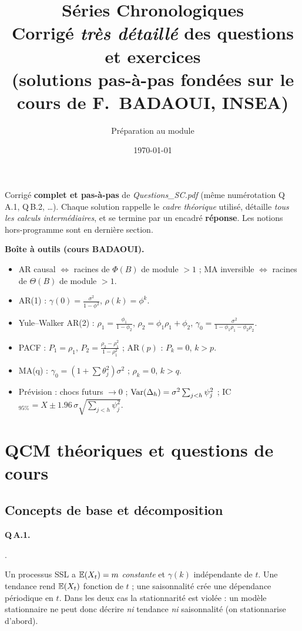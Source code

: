 \documentclass[11pt]{article}
\title{\vspace{-1cm}\textbf{\color{insea}Séries Chronologiques}\\[2mm]
\large Corrigé \emph{très détaillé} des questions et exercices\\[1mm]
\normalsize (solutions pas-à-pas fondées sur le cours de F.~BADAOUI, INSEA)}
\author{Préparation au module}
\date{\today}
\begin{document}
\maketitle
\thispagestyle{empty}

\begin{tcolorbox}[colback=insealight,colframe=insea,title={Mode d'emploi}]
Corrigé \textbf{complet et pas-à-pas} de \emph{Questions\_SC.pdf} (même numérotation
Q\,A.1, Q\,B.2, \dots). Chaque solution rappelle le \emph{cadre théorique} utilisé, détaille
\emph{tous les calculs intermédiaires}, et se termine par un encadré \textbf{\color{vert}réponse}.
Les notions hors-programme \horsprog{} sont en dernière section.

\smallskip\noindent\textbf{Boîte à outils (cours BADAOUI).}
\begin{itemize}[leftmargin=*,nosep]
\item AR causal $\iff$ racines de $\Phi(B)$ de module $>1$ ; MA inversible $\iff$ racines de
$\Theta(B)$ de module $>1$.
\item AR(1) : $\gamma(0)=\frac{\sigma^2}{1-\phi^2}$, $\rho(k)=\phi^k$.
\item Yule--Walker AR(2) : $\rho_1=\frac{\phi_1}{1-\phi_2}$, $\rho_2=\phi_1\rho_1+\phi_2$,
$\gamma_0=\frac{\sigma^2}{1-\phi_1\rho_1-\phi_2\rho_2}$.
\item PACF : $P_1=\rho_1$, $P_2=\frac{\rho_2-\rho_1^2}{1-\rho_1^2}$ ; AR$(p)$ : $P_k=0$, $k>p$.
\item MA(q) : $\gamma_0=(1+\sum\theta_j^2)\sigma^2$ ; $\rho_k=0$, $k>q$.
\item Prévision : chocs futurs $\to0$ ; $\operatorname{Var}(\Delta_h)=\sigma^2\sum_{j<h}\psi_j^2$ ;
IC$_{95\%}=\widehat X\pm1.96\,\sigma\sqrt{\sum_{j<h}\psi_j^2}$.
\end{itemize}
\end{tcolorbox}

\tableofcontents
\newpage

\section{QCM théoriques et questions de cours}

\subsection*{Concepts de base et décomposition}

\textbf{Q\,A.1.} \begin{reponse}.\end{reponse}
Un processus SSL a $\mathbb{E}(X_t)=m$ \emph{constante} et $\gamma(k)$ indépendante de $t$. Une
tendance rend $\mathbb{E}(X_t)$ fonction de $t$ ; une saisonnalité crée une dépendance périodique en
$t$. Dans les deux cas la stationnarité est violée : un modèle stationnaire ne peut donc
décrire \emph{ni} tendance \emph{ni} saisonnalité (on stationnarise d'abord).
\end{document}
